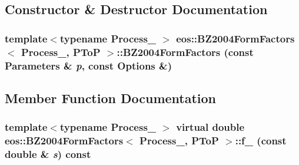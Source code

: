 \subsection{Constructor \& Destructor Documentation}
\hypertarget{classeos_1_1BZ2004FormFactors_3_01Process___00_01PToP_01_4_abfc24e63dc1d845b0a4996bea251b478}{
\subsubsection[{BZ2004FormFactors}]{\setlength{\rightskip}{0pt plus 5cm}template$<$typename Process\_\- $>$ eos::BZ2004FormFactors$<$ Process\_\-, {\bf PToP} $>$::BZ2004FormFactors (const {\bf Parameters} \& {\em p}, \/  const {\bf Options} \&)}}
\label{classeos_1_1BZ2004FormFactors_3_01Process___00_01PToP_01_4_abfc24e63dc1d845b0a4996bea251b478}


\subsection{Member Function Documentation}
\hypertarget{classeos_1_1BZ2004FormFactors_3_01Process___00_01PToP_01_4_a9a3225d30afba82d87ca09b4ce5565f5}{
\subsubsection[{f\_\-0}]{\setlength{\rightskip}{0pt plus 5cm}template$<$typename Process\_\- $>$ virtual double eos::BZ2004FormFactors$<$ Process\_\-, {\bf PToP} $>$::f\_ (const double \& {\em s}) const}}
\label{classeos_1_1BZ2004FormFactors_3_01Process___00_01PToP_01_4_a9a3225d30afba82d87ca09b4ce5565f5}



